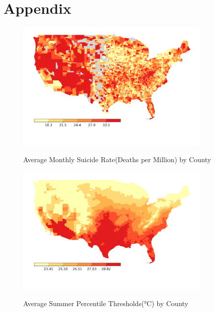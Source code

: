 \documentclass[12pt, a4paper]{article}
\begin{document}
\section{Appendix}
\appendix
\renewcommand{\thefigure}{A.\arabic{figure}}
\setcounter{figure}{0}

\begin{figure}[H]
    \centering
    \caption{Average Monthly Suicide Rate(Deaths per Million) by County}
    \includegraphics[width=0.85\textwidth]{suicide map.png}
    \label{fig:suicide_map}
\end{figure}


\begin{figure}[H]
    \centering
    \caption{Average Summer Percentile Thresholds(°C) by County}
    \includegraphics[width=0.85\textwidth]{thresholds.png}
    \label{fig:thresholds_map}
\end{figure}
\end{document}
